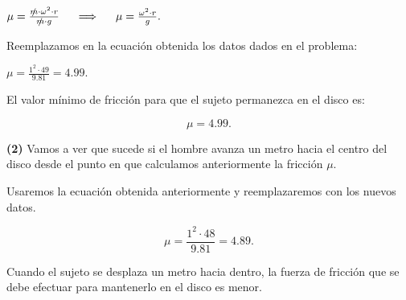 \documentclass[a4paper,12pt]{article} %
\begin{document}
\vspace{\baselineskip}

\begin{center}
    \( \mu = \frac{\slashed{m} \cdot \omega^2 \cdot r }{\slashed{m} \cdot g}\hspace{0.5 cm}  \Longrightarrow \hspace{0.5 cm} \mu = \frac{\omega^2 \cdot r}{g}.\)
\end{center}

\vspace{\baselineskip}

\begin{justify}
    Reemplazamos en la ecuación obtenida los datos dados en el problema: 
\end{justify}

\begin{center}
    \(\mu = \frac{1^2 \cdot 49}{9.81} = 4.99.\)
\end{center}

\vspace{\baselineskip}

\begin{justify}
    El valor mínimo de fricción para que el sujeto permanezca en el disco es:
\end{justify}

\begin{center}
    \[
    \boxed{\mu = 4.99.}
    \]
\end{center}

\newpage

\begin{justify}
    \textbf{(2)} Vamos a ver que sucede si el hombre avanza un metro hacia el centro del disco desde el punto en que calculamos anteriormente la fricción \(\mu.\)
\end{justify}

\begin{justify}
    Usaremos la ecuación obtenida anteriormente y reemplazaremos con los nuevos datos.
\end{justify}

\begin{center}
    \[
    \boxed{\mu = \frac{1^2 \cdot 48}{9.81} = 4.89.}
    \]
\end{center}

\begin{justify}
    Cuando el sujeto se desplaza un metro hacia dentro, la fuerza de fricción que se debe efectuar para mantenerlo en el disco es menor.
\end{justify}
\end{document}
